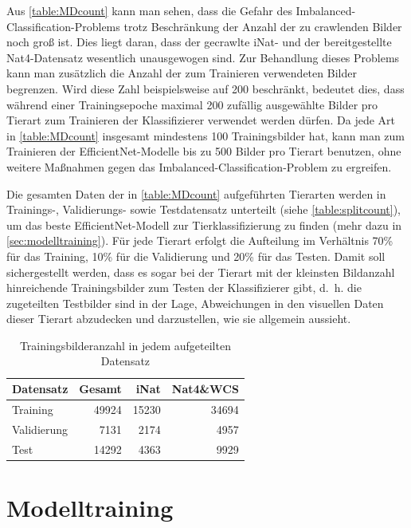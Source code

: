 Aus \autoref{table:MDcount} kann man sehen, dass die Gefahr des Imbalanced-Classification-Problems trotz Beschränkung der Anzahl der zu crawlenden Bilder noch groß ist. Dies liegt daran, dass der gecrawlte iNat- und der bereitgestellte Nat4-Datensatz wesentlich unausgewogen sind. Zur Behandlung dieses Problems kann man zusätzlich die Anzahl der zum Trainieren verwendeten Bilder begrenzen. Wird diese Zahl beispielsweise auf 200 beschränkt, bedeutet dies, dass während einer Trainingsepoche maximal 200 zufällig ausgewählte Bilder pro Tierart zum Trainieren der Klassifizierer verwendet werden dürfen. Da jede Art in \autoref{table:MDcount} insgesamt mindestens 100 Trainingsbilder hat, kann man zum Trainieren der EfficientNet-Modelle bis zu 500 Bilder pro Tierart benutzen, ohne weitere Maßnahmen gegen das Imbalanced-Classification-Problem zu ergreifen.

Die gesamten Daten der in \autoref{table:MDcount} aufgeführten Tierarten werden in Trainings-, Validierungs- sowie Testdatensatz unterteilt (siehe \autoref{table:splitcount}), um das beste EfficientNet-Modell zur Tierklassifizierung zu finden (mehr dazu in \autoref{sec:modelltraining}). Für jede Tierart erfolgt die Aufteilung im Verhältnis 70\% für das Training, 10\% für die Validierung und 20\% für das Testen. Damit soll sichergestellt werden, dass es sogar bei der Tierart mit der kleinsten Bildanzahl hinreichende Trainingsbilder zum Testen der Klassifizierer gibt, d.~h. die zugeteilten Testbilder sind in der Lage, Abweichungen in den visuellen Daten dieser Tierart abzudecken und darzustellen, wie sie allgemein aussieht.

\begin{table}[h]
	\centering
	\caption{Trainingsbilderanzahl in jedem aufgeteilten Datensatz}
	\label{table:splitcount}
	\begin{tabular}{l|r|r|r}
		\textbf{Datensatz}   & \textbf{Gesamt} & \textbf{iNat}  & \textbf{Nat4\&WCS} \\
		\hline
		Training    & 49924  & 15230 & 34694       \\
		Validierung & 7131   & 2174  & 4957        \\
		Test        & 14292  & 4363  & 9929       
	\end{tabular}
\end{table}

\section{Modelltraining} \label{sec:modelltraining}

